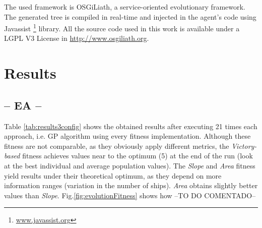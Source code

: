 \documentclass[preprint]{elsarticle}
\begin{document}


The used framework is OSGiLiath, a service-oriented evolutionary framework. %
The generated tree is compiled in real-time and injected in the agent's code using Javassist \footnote{\url{www.javassist.org}} library. All the source code used in this work is available under a LGPL V3 License in \url{http://www.osgiliath.org}.


\section{Results}
\label{sec:results}
\subsection{-- EA --}

Table \ref{tab:results3config} shows the obtained results after executing 21 times each approach, i.e. GP algorithm using every fitness implementation. 
Although these fitness are not comparable, as they obviously apply different metrics, the \textit{Victory-based} fitness achieves values near to the optimum (5) at the end of the run (look at the best individual and average population values). The \textit{Slope} and \textit{Area} fitness yield results under their theoretical optimum, 
as they depend on more information ranges (variation in the number of ships).
\textit{Area} obtains slightly better values than \textit{Slope}. Fig.\ref{fig:evolutionFitness} shows how --TO DO COMENTADO-- %

\end{document}
